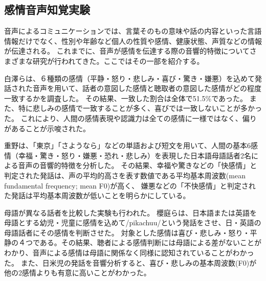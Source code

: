 \subsection{感情音声知覚実験}
\label{sec:PreviousStudy}
音声によるコミュニケーションでは、言葉そのもの意味や話の内容といった言語情報だけでなく、性別や年齢など個人の性質や感情、健康状態、声質などの情報が伝達される。
これまでに、音声が感情を伝達する際の音響的特徴についてさまざまな研究が行われてきた。ここではその一部を紹介する。

白澤らは、６種類の感情（平静・怒り・悲しみ・喜び・驚き・嫌悪）を込めて発話された音声を用いて、話者の意図した感情と聴取者の意図した感情がどの程度一致するかを調査した\cite{shirasawa1996Emo}。
その結果、一致した割合は全体で51.5\%であった。
また、特に悲しみの感情で一致することが多く、喜びでは一致しないことが多かった。
これにより、人間の感情表現や認識力は全ての感情に一様ではなく、偏りがあることが示唆された。

重野は、「東京」「さようなら」などの単語および短文を用いて、人間の基本6感情（幸福・驚き・怒り・嫌悪・恐れ・悲しみ）を表現した日本語母語話者2名による音声の音響的特徴を分析した\cite{shigeno2004Emo}。
その結果、幸福や驚きなどの「快感情」と判定された発話は、声の平均的高さを表す数値である平均基本周波数(mean fundamental frequency; mean F0)が高く、
嫌悪などの「不快感情」と判定された発話は平均基本周波数が低いことを明らかにしている。

母語が異なる話者を比較した実験も行われた。
櫻庭らは、日本語または英語を母語とする幼児・児童に感情を込めて/pikachuu/という発話をさせ、日・英語の母語話者にその感情を判断させた\cite{sakuraba2004Emo}。
対象とした感情は喜び・悲しみ・怒り・平静の４つである。その結果、聴者による感情判断には母語による差がないことがわかり、音声による感情は母語に関係なく同様に認知されていることがわかった。
また、日米児の発話を音響分析すると、喜び・悲しみの基本周波数(F0)が他の2感情よりも有意に高いことがわかった。

